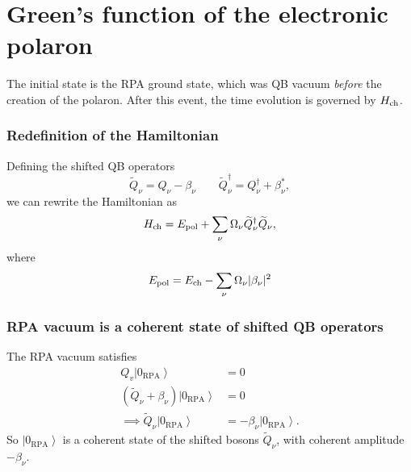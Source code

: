 \section{Green's function of the electronic polaron}
The initial state is the RPA ground state, which was QB vacuum \emph{before} the creation of the polaron. After this event, the time evolution is governed by $H_{\rm ch}$.
\subsubsection{Redefinition of the Hamiltonian}
Defining the shifted QB operators
\begin{equation}
\widetilde Q_\nu
=
Q_\nu
- \beta_\nu
\qquad
\widetilde Q_\nu^\dagger
=
Q_\nu^\dagger
+
\beta_\nu^*,
\end{equation}
we can rewrite the Hamiltonian as
\begin{equation}
H_{\rm ch}
=
E_{\rm pol}
+
\sum_\nu
\Omega_\nu
\widetilde Q_\nu^\dagger \widetilde Q_\nu ,
\end{equation}
where
\begin{equation}
E_{\rm pol}
=
E_{\rm ch}
-
\sum_\nu
\Omega_\nu |\beta_\nu|^2
\end{equation}
\subsubsection{RPA vacuum is a coherent state of shifted QB operators}
\label{subsec:RPA_vacuum_coherent_state}
The RPA vacuum satisfies
\begin{align}
    Q_v\left|0_{\mathrm{RPA}}\right\rangle&=0\\
\left(\widetilde{Q}_\nu+\beta_\nu\right)\left|0_{\mathrm{RPA}}\right\rangle&=0 \\
\implies
\widetilde{Q}_\nu\left|0_{\mathrm{RPA}}\right\rangle&=-\beta_\nu\left|0_{\mathrm{RPA}}\right\rangle .
\end{align}
So $\left|0_{\mathrm{RPA}}\right\rangle$ is a coherent state of the shifted bosons $\widetilde{Q}_\nu$, with coherent amplitude $-\beta_\nu$.
